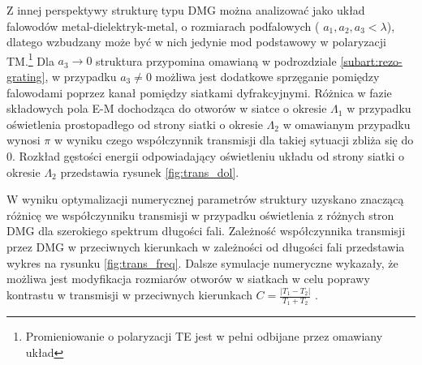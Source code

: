  Z innej perspektywy strukturę typu DMG można analizować jako układ falowodów metal-dielektryk-metal, o rozmiarach podfalowych ( $a_1,a_2,a_3 < \lambda$), dlatego wzbudzany może być w nich jedynie mod podstawowy w polaryzacji TM.\footnote{Promieniowanie o polaryzacji TE jest w pełni odbijane przez omawiany układ} Dla $a_3 \to 0$ struktura przypomina omawianą w podrozdziale \ref{subart:rezo-grating}, w przypadku $a_3 \ne 0$ możliwa jest dodatkowe sprzęganie pomiędzy falowodami poprzez kanał pomiędzy siatkami dyfrakcyjnymi. Różnica w fazie składowych pola E-M dochodząca do otworów w siatce o okresie $\Lambda_1$ w przypadku oświetlenia prostopadłego od strony siatki o okresie $\Lambda_2$ w omawianym przypadku wynosi $\pi$ w wyniku czego współczynnik transmisji dla takiej sytuacji zbliża się do 0. Rozkład gęstości energii odpowiadający oświetleniu układu od strony siatki o okresie $\Lambda_2$ przedstawia rysunek \ref{fig:trans_dol}.

W wyniku optymalizacji numerycznej parametrów struktury uzyskano znaczącą różnicę we współczynniku transmisji w przypadku oświetlenia z różnych stron DMG dla szerokiego spektrum długości fali\cite{Stolarek:13}. Zależność współczynnika transmisji przez DMG w przeciwnych kierunkach w zależności od długości fali przedstawia wykres na rysunku \ref{fig:trans_freq}. Dalsze symulacje numeryczne wykazały, że możliwa jest modyfikacja rozmiarów otworów w siatkach w celu poprawy kontrastu w transmisji w przeciwnych kierunkach $C=\frac{|T_1 - T_2|}{T_1+T_2}$ \cite{stolarek2013broadband}.


